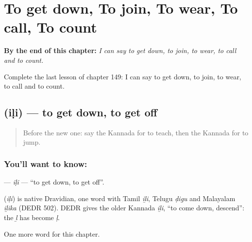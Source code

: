 
\chapter{To get down, To join, To wear, To call, To count}
\label{ch:ka-to-get-down-to-join-to-wear-to-call-to-count}

\begin{chapteropening}
\textbf{By the end of this chapter:} \emph{I can say to get down, to join, to wear, to call and to count.}

Complete the last lesson of chapter 149: I can say to get down, to join, to wear, to call and to count.
\end{chapteropening}

\section[\texorpdfstring{\kn{ಇಳಿ} (iḷi)}{ಇಳಿ (iḷi)}]{ (iḷi) — to get down, to get off}

\label{lesson:KA-C149-ili2}



\begin{quote}
Before the new one: say the Kannada for to teach, then the Kannada for to jump.
\end{quote}

\subsection*{You'll want to know: }
\textbf{} — \emph{iḷi} — \textquotedblleft{}to get down, to get off\textquotedblright{}.

\begin{cousinweb}
\textbf{} (\emph{iḷi}) is native Dravidian, one word with Tamil \emph{iḻi}, Telugu \emph{ḍigu} and Malayalam \emph{iḻika} (DEDR 502). DEDR gives the older Kannada \emph{iḻi}, \textquotedblleft{}to come down, descend\textquotedblright{}: the \emph{ḻ} has become \emph{ḷ}.
\end{cousinweb}

\begin{grammarlens}[title={What you've built}]
One more word for this chapter.
\end{grammarlens}

